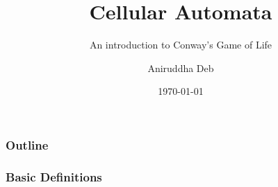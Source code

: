 \documentclass{beamer}
\title{Cellular Automata}
\subtitle{An introduction to Conway's Game of Life}
\author{Aniruddha Deb}
\institute{MathSoc IITD}
\date{\today}
\begin{document}
\begin{frame}
\titlepage
\end{frame}

\begin{frame}
\frametitle{Outline}
\tableofcontents
\end{frame}

\begin{frame}
\frametitle{Basic Definitions}

\end{frame}
\end{document}
